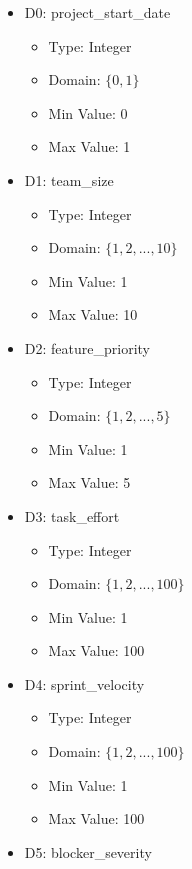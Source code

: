 \documentclass{article}
\begin{document}
\begin{itemize}
    \item D0: project\_start\_date
        \begin{itemize}
            \item Type: Integer
            \item Domain: $\{0, 1\}$
            \item Min Value: 0
            \item Max Value: 1
        \end{itemize}
    \item D1: team\_size
        \begin{itemize}
            \item Type: Integer
            \item Domain: $\{1, 2, ..., 10\}$
            \item Min Value: 1
            \item Max Value: 10
        \end{itemize}
    \item D2: feature\_priority
        \begin{itemize}
            \item Type: Integer
            \item Domain: $\{1, 2, ..., 5\}$
            \item Min Value: 1
            \item Max Value: 5
        \end{itemize}
    \item D3: task\_effort
        \begin{itemize}
            \item Type: Integer
            \item Domain: $\{1, 2, ..., 100\}$
            \item Min Value: 1
            \item Max Value: 100
        \end{itemize}
    \item D4: sprint\_velocity
        \begin{itemize}
            \item Type: Integer
            \item Domain: $\{1, 2, ..., 100\}$
            \item Min Value: 1
            \item Max Value: 100
        \end{itemize}
    \item D5: blocker\_severity

\end{itemize}
\end{document}
